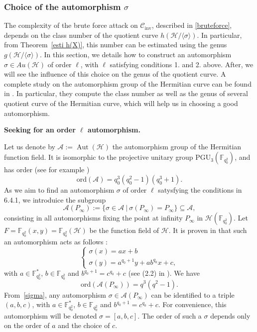 \documentclass[10pt]{article}
\theoremstyle{definition}
\theoremstyle{definition}
\theoremstyle{definition}
\newcommand{\s}{\vspace{0.3cm}}
\newcommand{\C}{\mathcal{C}}
\newcommand{\calA}{\mathcal{A}}
\newcommand{\calH}{\mathcal{H}}
\newcommand{\su}{\subseteq}
\newcommand{\h}{\mathcal{H}}
\newcommand{\Aut}{\operatorname{Aut}}
\begin{document}
\s

\subsubsection{Choice of the automorphism $\sigma$}

\s

The complexity of the brute force attack on $\C_{\textrm{inv}}$, described in \ref{bruteforce}, depends on the class number of the quotient curve $h(\mathcal{H}/\langle \sigma \rangle)$. In particular, from Theorem~\ref{esti h(X)}, this number can be estimated using the genus $g(\mathcal{H}/\langle \sigma \rangle)$. In this section, we details how to construct an automorphism $\sigma \in Au(\h)$ of order $\ell$, with $\ell$ satisfying conditions 1. and 2. above. After, we will see the influence of this choice on the genus of the quotient curve. A complete study on the automorphism group of the Hermitian curve can be found in \cite{Gar}. In particular, they compute the class number as well as the genus of several quotient curve of the Hermitian curve, which will help us in choosing a good automorphism.

\s

\textbf{Seeking for an order $\ell$ automorphism.}

\s 


Let us denote by $\calA := \Aut(\calH)$ the automorphism group of the Hermitian function field. It is isomorphic to the projective unitary group $\mathrm{PGU}_3(\mathbb{F}_{q_0^2})$, and has order (see for example \cite{Sti})
\[\mathrm{ord}(\calA) =  q_0^3(q_0^2-1)(q_0^3+1).\]
As we aim to find an automorphism $\sigma$ of order $\ell$ satysfying the conditions in 6.4.1, we introduice the subgroup
\[\calA(P_{\infty}) := \{ \sigma \in \calA \ | \ \sigma(P_{\infty}) = P_{\infty}\} \su \calA ,\]
consisting in all automorphisms fixing the point at infinity $P_{\infty}$ in $\calH(\mathbb{F}_{q_0^2})$. Let $F=\mathbb{F}_{q_0^2}(x,y)=\mathbb{F}_{q_0^2}(\calH)$ be the function field of $\calH$. It is proven in \cite{Gar} that such an automorphism acts as follows :
\begin{equation} \label{sigma}
\left\{ \begin{array}{ll}
\sigma(x) = ax+b \\
\sigma(y) = a^{q_0+1}y+ab^{q_0}x+c,
\end{array} \right.
\end{equation}
with $a \in \mathbb{F}_{q_0^2}^*$, $b \in \mathbb{F}_{q_0^2}$ and $b^{q_0+1} = c^{q_0}+c$ (see (2.2) in \cite{Gar}). We have 
\[\mathrm{ord}(\calA(P_{\infty})) = q^3(q^2-1).\]
From~\eqref{sigma}, any automorphism $\sigma \in \calA(P_{\infty})$ can be identified to a triple $(a,b,c)$, with $a \in \mathbb{F}_{q_0^2}^*$, $b \in \mathbb{F}_{q_0^2}$ and $b^{q_0+1} = c^{q_0}+c$. For convenience, this automorphism will be denoted $\sigma = [a,b,c]$. The order of such a $\sigma$ depends only on the order of $a$ and the choice of $c$.
\end{document}
